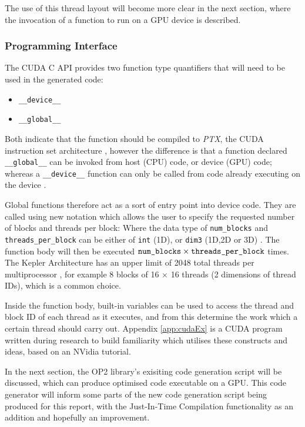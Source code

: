 \noindent The use of this thread layout will become more clear in the next section, where the invocation of a function to run on a GPU device is described.

\subsubsection{Programming Interface}
The CUDA C API provides two function type quantifiers that will need to be used in the generated code:
\begin{itemize}
\vspace{-.5cm}
\setlength{\itemsep}{0pt}%
\setlength{\parskip}{0pt}%
\item{\verb|__device__|}
\item{\verb|__global__|}
\vspace{-.5cm}
\end{itemize}
Both indicate that the function should be compiled to \textit{PTX}, the CUDA instruction set architecture \cite[p15]{guide}, however the difference is that a function declared \verb|__global__| can be invoked from host (CPU) code,  or device (GPU) code; whereas a \verb|__device__| function can only be called from code already executing on the device \cite[p81]{guide}.
\par
Global functions therefore act as a sort of entry point into device code. They are called using new notation which allows the user to specify the requested number of blocks and threads per block:
\noindent Where the data type of \verb|num_blocks| and \verb|threads_per_block| can be either of \verb|int| (1D), or \verb|dim3| (1D,2D or 3D) \cite[p9]{guide}. The function body will then be executed $\verb|num_blocks| \times  \verb|threads_per_block|$ times. The Kepler Architecture has an upper limit of 2048 total threads per multiprocessor \cite{kepler}, for example 8 blocks of 16 $\times$ 16 threads (2 dimensions of thread IDs), which is a common choice.
\par
Inside the function body, built-in variables can be used to access the thread and block ID of each thread as it executes, and from this determine the work which a certain thread should carry out. Appendix \ref{app:cudaEx} is a CUDA program written during research to build familiarity which utilises these constructs and ideas, based on an NVidia tutorial.
\par
In the next section, the OP2 library's exisiting code generation script will be discussed, which can produce optimised code executable on a GPU. This code generator will inform some parts of the new code generation script being produced for this report, with the Just-In-Time Compilation functionality as an addition and hopefully an improvement.


